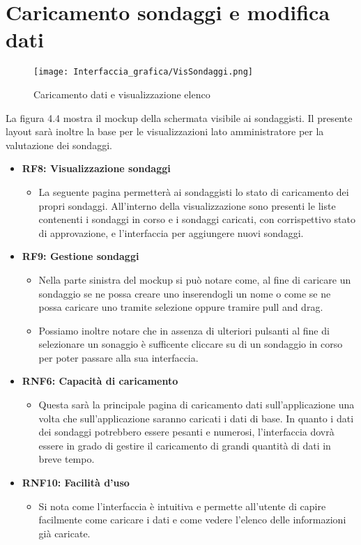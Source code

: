 \section{Caricamento sondaggi e modifica dati}
    \label{fig:4.4}
    \begin{figure}[H]
        \center
        \texttt{[image: Interfaccia\_grafica/VisSondaggi.png]}
        \caption{Caricamento dati e visualizzazione elenco}
    \end{figure} 
    La figura 4.4 mostra il mockup della schermata visibile ai sondaggisti.\newline
    Il presente layout sarà inoltre la base per le visualizzazioni lato amministratore per la valutazione dei sondaggi.
    \begin{itemize}
        \item \textbf{RF8: Visualizzazione sondaggi} \begin{itemize}
            \item La seguente pagina permetterà ai sondaggisti lo stato di caricamento dei propri sondaggi. All'interno della visualizzazione sono presenti le liste contenenti i sondaggi in corso e i sondaggi caricati, con corrispettivo stato di approvazione, e l'interfaccia per aggiungere nuovi sondaggi.
        \end{itemize}
        \item \textbf{RF9: Gestione sondaggi} \begin{itemize}
            \item Nella parte sinistra del mockup si può notare come, al fine di caricare un sondaggio se ne possa creare uno inserendogli un nome o come se ne possa caricare uno tramite selezione oppure tramire pull and drag.
            \item Possiamo inoltre notare che in assenza di ulteriori pulsanti al fine di selezionare un sonaggio è sufficente cliccare su di un sondaggio in corso per poter passare alla sua interfaccia.
        \end{itemize}
        \item \textbf{RNF6: Capacità di caricamento} \begin{itemize}
            \item Questa sarà la principale pagina di caricamento dati sull'applicazione una volta che sull'applicazione saranno caricati i dati di base. In quanto i dati dei sondaggi potrebbero essere pesanti e numerosi, l'interfaccia dovrà essere in grado di gestire il caricamento di grandi quantità di dati in breve tempo.
        \end{itemize}
        \item \textbf{RNF10: Facilità d'uso} \begin{itemize}
            \item Si nota come l'interfaccia è intuitiva e permette all'utente di capire facilmente come caricare i dati e come vedere l'elenco delle informazioni già caricate.
        \end{itemize}
    \end{itemize}


